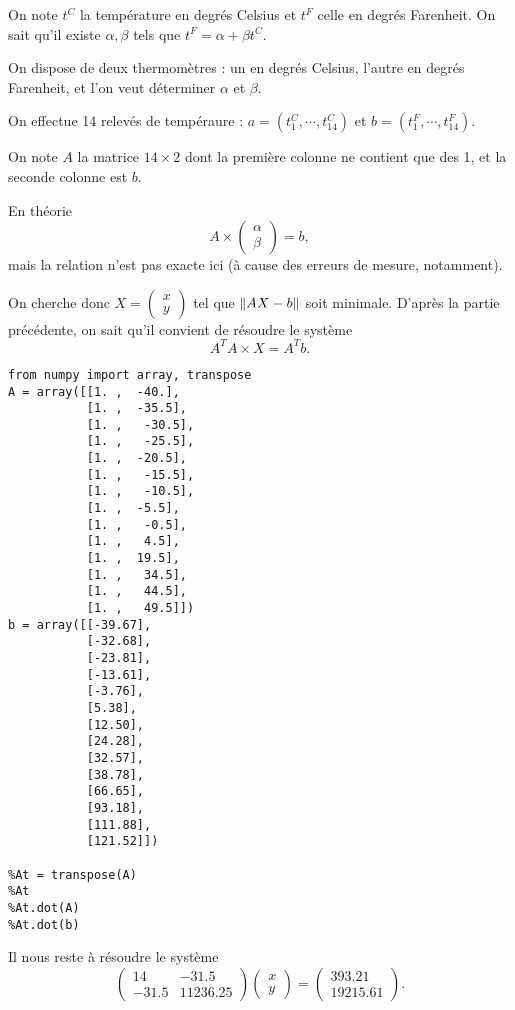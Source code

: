 \begin{exemple}


On note $t^C$ la température en degrés Celsius et $t^F$ celle en degrés Farenheit. On sait qu'il existe $\alpha,\beta$ tels que $t^F=\alpha+\beta t^C$.

On dispose de deux thermomètres : un en degrés Celsius, l'autre en degrés Farenheit, et l'on veut déterminer $\alpha$ et $\beta$.

On effectue 14 relevés de tempéraure : $a=(t^C_1,\cdots,t^C_{14})$ et $b=(t^F_1,\cdots,t^F_{14})$. 

On note $A$ la matrice $14\times 2$ dont la première colonne ne contient que des 1, et la seconde colonne est $b$.

En théorie
\begin{equation*}
  A\times\begin{pmatrix} \alpha\\\beta\end{pmatrix}=b,
\end{equation*}
mais la relation n'est pas exacte ici (à cause des erreurs de mesure, notamment). 

On cherche donc $X=\begin{pmatrix} x\\y\end{pmatrix}$ tel que $\left\Vert {AX-b}\right\Vert$ soit minimale. D'après la partie précédente, on sait qu'il convient de résoudre le système 
\begin{equation*}
  A^TA \times X = A^Tb.
\end{equation*}

\begin{lstlisting}
from numpy import array, transpose
A = array([[1. ,  -40.],
           [1. ,  -35.5],
           [1. ,   -30.5],
           [1. ,   -25.5],
           [1. ,  -20.5],
           [1. ,   -15.5],
           [1. ,   -10.5],
           [1. ,  -5.5],
           [1. ,   -0.5],
           [1. ,   4.5],
           [1. ,  19.5],
           [1. ,   34.5],
           [1. ,   44.5],
           [1. ,   49.5]])
b = array([[-39.67],
           [-32.68],
           [-23.81],
           [-13.61],
           [-3.76],
           [5.38],
           [12.50],
           [24.28],
           [32.57],
           [38.78],
           [66.65],
           [93.18],
           [111.88],
           [121.52]])

%At = transpose(A)
%At
%At.dot(A)
%At.dot(b)
\end{lstlisting}
Il nous reste à résoudre le système 
$$\begin{pmatrix} 14 & -31.5\\-31.5&11236.25\end{pmatrix}\begin{pmatrix} 
x\\y\end{pmatrix}=\begin{pmatrix} 393.21\\19215.61\end{pmatrix}.$$


\end{exemple}
